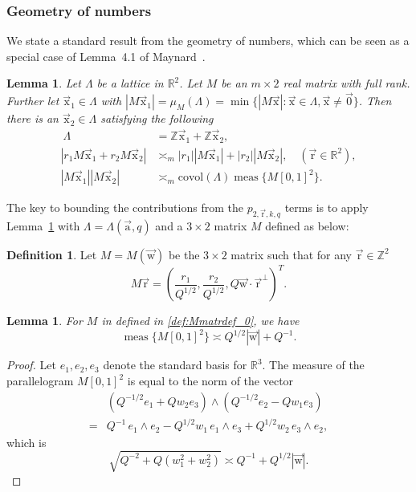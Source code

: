 \documentclass[letterpaper,11pt]{amsart}
\numberwithin{equation}{section}
\newtheorem{lemma}[theorem]{Lemma}
\theoremstyle{definition}
\newtheorem{definition}[theorem]{Definition}
\numberwithin{equation}{section}
\newcommand{\Z}{\mathbb{Z}}
\newcommand{\RR}{\mathbb{R}}
\newcommand{\ux}{{\vec{\mathrm{x}}}}
\newcommand{\ua}{\vec{\mathrm{a}}}
\newcommand{\ur}{\vec{\mathrm{r}}}
\newcommand{\uw}{{\vec{\mathrm{w}}}}
\DeclareMathOperator{\meas}{meas}
\newcommand{\R}{\mathbb{R}}
\begin{document}
\subsubsection{Geometry of numbers}



We state a standard result from the geometry of numbers, which can be seen as a special case of Lemma~4.1 of Maynard~\cite{Maynard}. 
\begin{lemma}\label{lem:minkowski_basis}
	Let $\Lambda$ be a lattice in $\RR^2$.
	Let \(M\) be an \(m \times 2\) real matrix with full rank. Further let 
	\( \ux_1 \in \Lambda \) with \(|M\ux_1| = \mu_M(\Lambda )=\min\{ |M\ux| : \ux \in \Lambda, \ux \neq\vec{0}\}\). Then there is an \(\ux_2\in \Lambda \) satisfying the following
	\begin{align*}\
	\Lambda & = \Z \ux_1 + \Z \ux_2,
	\\
	| r_1 M\ux_1 + r_2 M\ux_2 |
	&\asymp_m |r_1||M\ux_1| + |r_2| |M\ux_2|,
	\quad (\ur\in\R^2),
	\\
	|  M\ux_1 || M\ux_2 |
	&\asymp_m
	\mathrm{covol}(\Lambda)\meas\{ M [0,1]^2 \}.
	\end{align*}
\end{lemma}
The key to bounding the contributions from the $p_{2,\ur,k,q}$ terms is to apply Lemma~\ref{lem:minkowski_basis} with $\Lambda=\Lambda(\ua,q)$ and a $3\times 2$ matrix $M$ defined as below:
\begin{definition}		
Let $M=M(\uw)$ be the $3\times 2$ matrix such that for any $\ur\in \Z^2$ 
	\begin{equation}\label{def:Mmatrdef_0}
		M\ur
		=
		\left(\frac{r_1}{Q^{1/2}},
		\frac{r_2}{Q^{1/2}},
		Q\uw\cdot \ur^\perp\right)^T.
	\end{equation}
	
\end{definition}
\begin{lemma}
	\label{lem:matrix_M}
	 For $M$ in defined in \eqref{def:Mmatrdef_0}, we have 
	\begin{equation*}
		\meas \big\{ M [0,1]^2 \big\} \asymp  Q^{1/2}|\uw|+Q^{-1}.
	\end{equation*}
\end{lemma} 
\begin{proof}
Let $e_1,e_2,e_3$ denote the standard basis for $\RR^3$. The measure of the parallelogram $M[0,1]^2$ is equal to the norm of the vector \begin{align*}
&(Q^{-1/2}e_1 + Q w_2 e_3)\wedge(Q^{-1/2}e_2 - Q w_1 e_3)\\ =& Q^{-1} \, e_1 \wedge e_2 - Q^{1/2} w_1 \, e_1 \wedge e_3 + Q^{1/2} w_2 \, e_3 \wedge e_2,
\end{align*}
which is
\begin{equation*}
\sqrt{Q^{-2} + Q(w_1^2+w_2^2)}\asymp Q^{-1}+Q^{1/2}|\uw|.
\end{equation*}

\end{proof}
\end{document}
